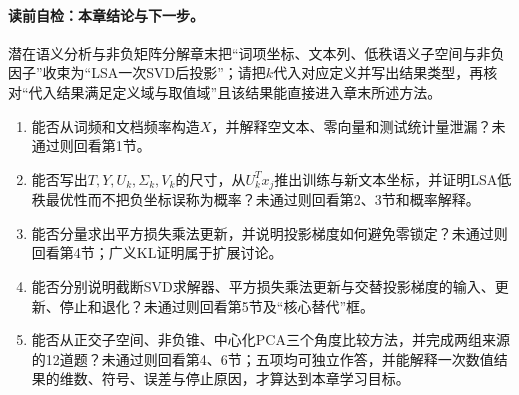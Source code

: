 \paragraph{读前自检：本章结论与下一步。}潜在语义分析与非负矩阵分解章末把“词项坐标、文本列、低秩语义子空间与非负因子”收束为“LSA一次SVD后投影”；请把$k$代入对应定义并写出结果类型，再核对“代入结果满足定义域与取值域”且该结果能直接进入章末所述方法。\par

\begin{SLCompactClosure}
\label{struct:V4-C05-CH36}

\label{struct:V4-C05-CH37}
\begin{selfcheckbox}
\begin{enumerate}[leftmargin=2.2em]
  \item 能否从词频和文档频率构造$X$，并解释空文本、零向量和测试统计量泄漏？未通过则回看第1节。
  \item 能否写出$T,Y,U_k,\Sigma_k,V_k$的尺寸，从$U_k^Tx_j$推出训练与新文本坐标，并证明LSA低秩最优性而不把负坐标误称为概率？未通过则回看第2、3节和概率解释。
  \item 能否分量求出平方损失乘法更新，并说明投影梯度如何避免零锁定？未通过则回看第4节；广义KL证明属于扩展讨论。
  \item 能否分别说明截断SVD求解器、平方损失乘法更新与交替投影梯度的输入、更新、停止和退化？未通过则回看第5节及“核心替代”框。
  \item 能否从正交子空间、非负锥、中心化PCA三个角度比较方法，并完成两组来源的12道题？未通过则回看第4、6节；五项均可独立作答，并能解释一次数值结果的维数、符号、误差与停止原因，才算达到本章学习目标。
\end{enumerate}
\end{selfcheckbox}
\end{SLCompactClosure}
